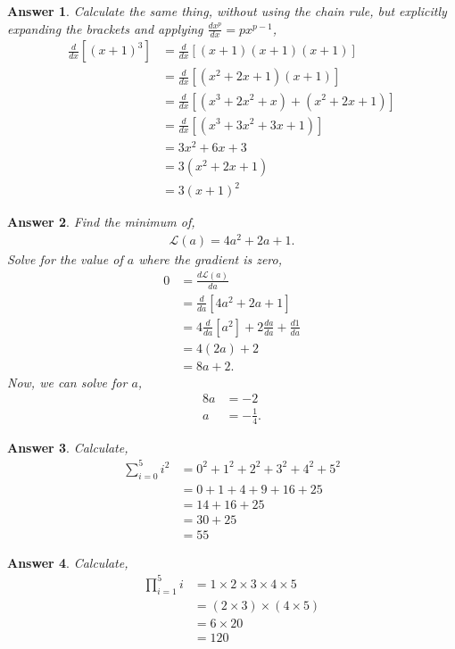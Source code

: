 \documentclass{article}
\newcommand{\dt}[2][]{\frac{d #1}{d #2}}
\renewcommand{\L}{\mathcal{L}}
\newtheorem{answer}{Answer}
\begin{document}
\begin{answer}
  Calculate the same thing, without using the chain rule, but explicitly expanding the brackets and applying $\dt[x^p]{x} = p x^{p-1}$,
  \begin{align}
    \dt{x} [(x+1)^3] &= \dt{x}[(x+1) (x+1) (x+1)]\\
    &= \dt{x}[(x^2 + 2 x + 1) (x+1)]\\
    &= \dt{x}[(x^3 + 2 x^2 + x) + (x^2 + 2 x + 1)]\\
    &= \dt{x}[(x^3 + 3 x^2 + 3 x + 1)]\\
    &= 3 x^2 + 6 x + 3\\
    &= 3 (x^2 + 2 x + 1)\\
    &= 3 (x+1)^2
  \end{align}
\end{answer}

\begin{answer}
  Find the minimum of,
  \begin{align}
    \L(a) = 4 a^2 + 2 a + 1.
  \end{align}
  Solve for the value of $a$ where the gradient is zero,
  \begin{align}
    0 &= \dt[\L(a)]{a} \\
    &= \dt{a}[4 a^2 + 2 a + 1]\\
    &= 4 \dt{a}[a^2] + 2 \dt[a]{a} + \dt[1]{a}\\
    &= 4 (2 a) + 2\\
    &= 8 a + 2.
  \end{align}
  Now, we can solve for $a$,
  \begin{align}
    8 a &= -2\\
    a &= -\tfrac{1}{4}.
  \end{align}
\end{answer}

\begin{answer}
  Calculate,
  \begin{align}
    \sum_{i=0}^5 i^2 &= 0^2 + 1^2 + 2^2 + 3^2 + 4^2 + 5^2\\
    &= 0 + 1 + 4 + 9 + 16 + 25\\
    &= 14+16+25\\
    &= 30+25\\
    &= 55
  \end{align}
\end{answer}

\begin{answer}
  Calculate,
  \begin{align}
    \prod_{i=1}^5 i &= 1 \times 2 \times 3 \times 4 \times 5\\
    &= (2 \times 3) \times (4 \times 5)\\
    &= 6 \times 20\\
    &= 120
  \end{align}
\end{answer}
\end{document}
